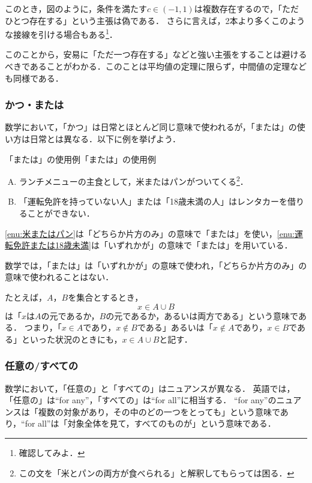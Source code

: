 \documentclass[a4paper,11pt]{ltjsarticle}
\begin{document}
このとき，図のように，条件を満たす$c \in (-1,1)$は複数存在するので，「ただひとつ存在する」という主張は偽である．
さらに言えば，2本より多くこのような接線を引ける場合もある\footnote{確認してみよ．}．

このことから，安易に「ただ一つ存在する」などと強い主張をすることは避けるべきであることがわかる．このことは平均値の定理に限らず，中間値の定理なども同様である．


\subsubsection{かつ・または}

数学において，「かつ」は日常とほとんど同じ意味で使われるが，「または」の使い方は日常とは異なる．以下に例を挙げよう．

\begin{example}{「または」の使用例}{「または」の使用例}
  \begin{enumerate}[(A)]
    \item ランチメニューの主食として，米またはパンがついてくる\footnote{この文を「米とパンの両方が食べられる」と解釈してもらっては困る．}．\label{enu:米またはパン}
    \item 「運転免許を持っていない人」または「18歳未満の人」はレンタカーを借りることができない． \label{enu:運転免許または18歳未満}
  \end{enumerate}
  \ref{enu:米またはパン}は「どちらか片方のみ」の意味で「または」を使い，\ref{enu:運転免許または18歳未満}は「いずれかが」の意味で「または」を用いている．
\end{example}

数学では，「または」は「いずれかが」の意味で使われ，「どちらか片方のみ」の意味で使われることはない．

たとえば，$A$，$B$を集合とするとき，
\[
  x \in A \cup B
\]
は「$x$は$A$の元であるか，$B$の元であるか，あるいは両方である」という意味である．
つまり，「$ x \in A$であり，$x \notin  B$である」あるいは「$ x \notin A$であり，$x \in B$である」といった状況のときにも，$x \in A \cup B$と記す．

\subsubsection{任意の/すべての}

数学において，「任意の」と「すべての」はニュアンスが異なる．
英語では，「任意の」は``for any''，「すべての」は``for all''に相当する．
``for any''のニュアンスは「複数の対象があり，その中のどの一つをとっても」という意味であり，``for all''は「対象全体を見て，すべてのものが」という意味である．
\end{document}
